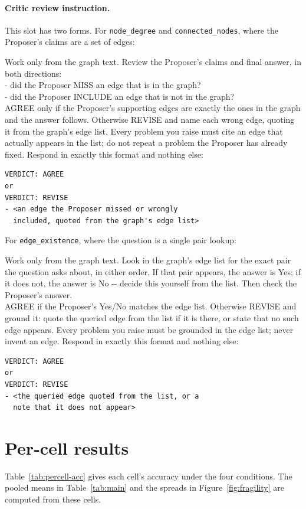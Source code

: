 \documentclass[11pt]{article}
\begin{document}
\paragraph{Critic review instruction.}
This slot has two forms. For \texttt{node\_degree} and \texttt{connected\_nodes},
where the Proposer's claims are a set of edges:

\begin{promptblock}
Work only from the graph text. Review the Proposer's claims and final answer, in both
directions:\\
- did the Proposer MISS an edge that is in the graph?\\
- did the Proposer INCLUDE an edge that is not in the graph?\\
AGREE only if the Proposer's supporting edges are exactly the ones in the graph and the
answer follows. Otherwise REVISE and name each wrong edge, quoting it from the graph's
edge list. Every problem you raise must cite an edge that actually appears in the list;
do not repeat a problem the Proposer has already fixed. Respond in exactly this format
and nothing else:
\begin{verbatim}
VERDICT: AGREE
or
VERDICT: REVISE
- <an edge the Proposer missed or wrongly
  included, quoted from the graph's edge list>
\end{verbatim}
\end{promptblock}

\noindent For \texttt{edge\_existence}, where the question is a single pair lookup:

\begin{promptblock}
Work only from the graph text. Look in the graph's edge list for the exact pair the
question asks about, in either order. If that pair appears, the answer is Yes; if it
does not, the answer is No -{}- decide this yourself from the list. Then check the
Proposer's answer.\\
AGREE if the Proposer's Yes/No matches the edge list. Otherwise REVISE and ground it:
quote the queried edge from the list if it is there, or state that no such edge appears.
Every problem you raise must be grounded in the edge list; never invent an edge. Respond
in exactly this format and nothing else:
\begin{verbatim}
VERDICT: AGREE
or
VERDICT: REVISE
- <the queried edge quoted from the list, or a
  note that it does not appear>
\end{verbatim}
\end{promptblock}

\section{Per-cell results}
\label{sec:percell}
Table~\ref{tab:percell-acc} gives each cell's accuracy under the four conditions. The
pooled means in Table~\ref{tab:main} and the spreads in Figure~\ref{fig:fragility} are
computed from these cells.
\end{document}
